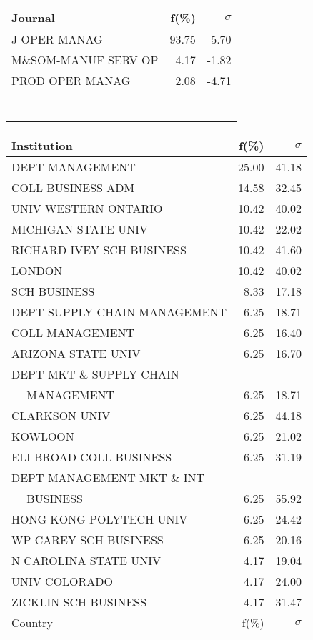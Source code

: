 \documentclass[a4paper,11pt]{report}
\begin{document}
\begin{landscape}
\begin{table}[!ht]
{\begin{tabular}{|l r r|}
\hline
\hline
Journal & f(\%) & $\sigma$\\
\hline
J OPER MANAG & 93.75 & 5.70\\
M\&SOM-MANUF SERV OP & 4.17 & -1.82\\
PROD OPER MANAG & 2.08 & -4.71\\
 &  & \\
 &  & \\
 &  & \\
 &  & \\
 &  & \\
 &  & \\
 &  & \\
\hline
\end{tabular}
}
{\scriptsize\begin{tabular}{|l r r|}
\hline
Institution & f(\%) & $\sigma$\\
\hline
DEPT MANAGEMENT & 25.00 & 41.18\\
COLL BUSINESS ADM & 14.58 & 32.45\\
UNIV WESTERN ONTARIO & 10.42 & 40.02\\
MICHIGAN STATE UNIV & 10.42 & 22.02\\
RICHARD IVEY SCH BUSINESS & 10.42 & 41.60\\
LONDON & 10.42 & 40.02\\
SCH BUSINESS & 8.33 & 17.18\\
DEPT SUPPLY CHAIN MANAGEMENT & 6.25 & 18.71\\
COLL MANAGEMENT & 6.25 & 16.40\\
ARIZONA STATE UNIV & 6.25 & 16.70\\
DEPT MKT \& SUPPLY CHAIN &  & \\
$\quad$ MANAGEMENT & 6.25 & 18.71\\
CLARKSON UNIV & 6.25 & 44.18\\
KOWLOON & 6.25 & 21.02\\
ELI BROAD COLL BUSINESS & 6.25 & 31.19\\
DEPT MANAGEMENT MKT \& INT &  & \\
$\quad$ BUSINESS & 6.25 & 55.92\\
HONG KONG POLYTECH UNIV & 6.25 & 24.42\\
WP CAREY SCH BUSINESS & 6.25 & 20.16\\
N CAROLINA STATE UNIV & 4.17 & 19.04\\
UNIV COLORADO & 4.17 & 24.00\\
ZICKLIN SCH BUSINESS & 4.17 & 31.47\\
\hline
\hline
Country & f(\%) & $\sigma$\\

\end{tabular}}
\end{table}
\end{landscape}
\end{document}
